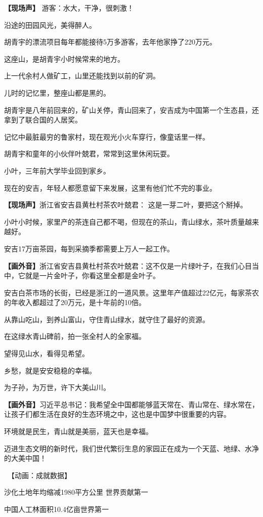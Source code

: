 \documentclass{ctexart}
\newcommand{\zkh}[1]{\textbf{\hspace{-2.7em} 【#1】}}
\begin{document}
 \zkh{现场声} 游客：水大，干净，很刺激！

 沿途的田园风光，美得醉人。

 胡青宇的漂流项目每年都能接待5万多游客，去年他家挣了220万元。

 这座山，是胡青宇小时候常来的地方。

 上一代余村人做矿工，山里还能找到以前的矿洞。

 儿时的记忆里，整座山都是黑的。

胡青宇是八年前回来的，矿山关停，青山回来了，安吉成为中国第一个生态县，还拿到了联合国的人居奖。

 记忆中最脏最穷的鲁家村，现在观光小火车穿行，像童话里一样。

 胡青宇和童年的小伙伴叶兢君，常常到这里休闲玩耍。

 小叶，三年前大学毕业回到家乡。

 现在的安吉，年轻人都愿意留下来发展，这里有他们忙不完的事业。

 \zkh{现场声}浙江省安吉县黄杜村茶农叶兢君： 这是一芽二叶，要把这个掰掉。

 
小叶小时候，家里产的茶连自己都不喝，但现在的茶山，青山绿水，茶叶质量越来越好。

 安吉17万亩茶园，每到采摘季都需要上万人一起工作。

 \zkh{画外音}浙江省安吉县黄杜村茶农叶兢君：这不仅是一片绿叶子，在我们心目当中，它就是一片金叶子，你看这里全都是金叶子。

 
安吉白茶市场的长街，已经是浙江的一道风景。这里年产值超过22亿元，每家茶农的年收入都超过了20万元，是十年前的10倍。

 从靠山吃山，到养山富山，守住青山绿水，就守住了最好的资源。

 在这绿水青山碑前，拍一张全村人的全家福。

 望得见山水，看得见希望。

 乡愁，就是安安稳稳的幸福。

 为子孙，为万世，许下大美山川。

 \zkh{画外音}习近平总书记：我希望全中国都能够蓝天常在、青山常在、绿水常在，让孩子们都生活在良好的生态环境之中，这也是中国梦中很重要的内容。

 环境就是民生，青山就是美丽，蓝天也是幸福。

迈进生态文明的新时代，我们世代繁衍生息的家园正在成为一个天蓝、地绿、水净的大美中国！

 　【动画：成就数据】 
 
 沙化土地年均缩减1980平方公里 世界贡献第一

 中国人工林面积10.4亿亩世界第一
\end{document}
